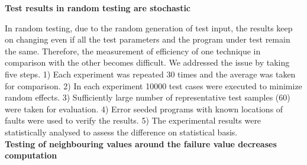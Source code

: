 








\textbf{Test results in random testing are stochastic} 

In random testing, due to the random generation of test input, the results keep on changing even if all the test parameters and the program under test remain the same. Therefore, the measurement of efficiency of one technique in comparison with the other becomes difficult. We addressed  the issue by taking five steps. 1) Each experiment was repeated 30 times and the average was taken for comparison. 2) In each experiment 10000 test cases were executed to minimize random effects. 3) Sufficiently large number of representative test samples (60) were taken for evaluation. 4) Error seeded programs with known locations of faults were used to verify the results. 5) The experimental results were statistically analysed to assess the difference on statistical basis.\\


   
\textbf{Testing of neighbouring values around the failure value decreases computation}

